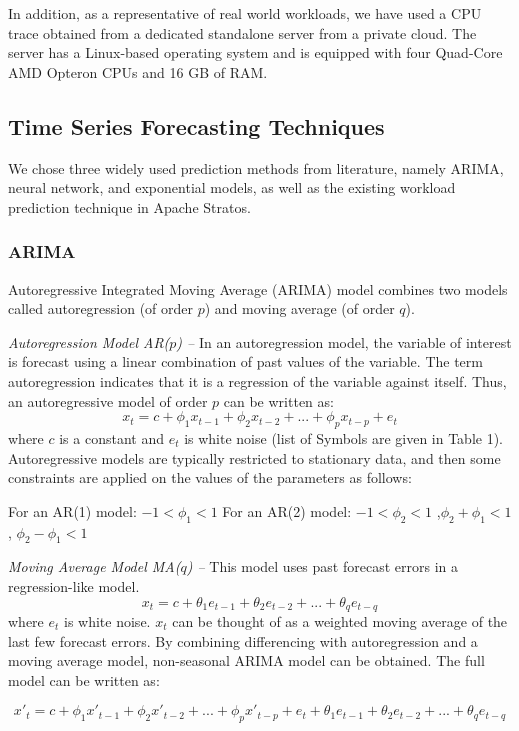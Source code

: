 In addition, as a representative of real world workloads, we have used a CPU trace obtained from a dedicated standalone server from a private cloud. The server has a Linux-based operating system and is equipped with four Quad-Core AMD Opteron CPUs and 16 GB of RAM.

\subsection{Time Series Forecasting Techniques}
We chose three widely used prediction methods from literature, namely ARIMA, neural network, and exponential models, as well as the existing workload prediction technique in Apache Stratos.

\subsubsection{ARIMA}
Autoregressive Integrated Moving Average (ARIMA) model combines two models called autoregression (of order $p$) and moving average (of order $q$).

\noindent
\textit{Autoregression Model AR($p$) --}
In an autoregression model, the variable of interest is forecast using a linear combination of past values of the variable. The term autoregression indicates that it is a regression of the variable against itself. Thus, an autoregressive model of order $p$ can be written as:
	$$x_t = c + \phi_1x_{ t-1} + \phi_2x_{t-2} +...+ \phi_px_{t-p} + e_{t}$$
where $c$ is a constant and $e_t$ is white noise (list of Symbols are given in Table 1). Autoregressive models are typically restricted to stationary data, and then some constraints are applied on the values of the parameters \cite{Forecasting_OTexts} as follows:

    For an AR(1) model: $-1 < \phi_{1} < 1$
    For an AR(2) model: $-1 < \phi_{2} < 1$ ,$\phi_{2}+ \phi_{1} < 1$ , $\phi_{2} - \phi_{1} < 1$

\noindent
\textit{Moving Average Model MA($q$) --}
This model uses past forecast errors in a regression-like model.
	$$x_t = c + \theta_1e_{ t-1} + \theta_2e_{t-2} +...+ \theta_qe_{t-q}$$
where $e_t$ is white noise. $x_t$ can be thought of as a weighted moving average of the last few forecast errors. 
By combining differencing with autoregression and a moving average model, non-seasonal ARIMA model can be obtained. The full model can be written as:

$$	{x}'_t = c+ \phi_1{x}'_{ t-1} + \phi_2{x}'_{t-2} +...+ \phi_p{x}'_{t-p} + e_{t} + \theta_1e_{ t-1} + \theta_2e_{t-2} +...+ \theta_qe_{t-q}$$

